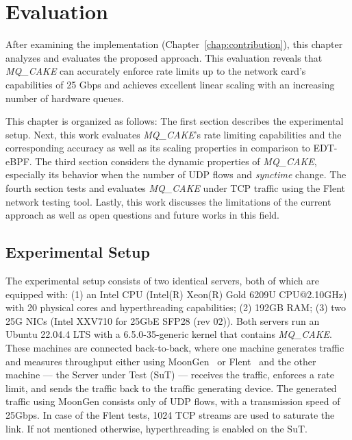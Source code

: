 \section{Evaluation}\label{sec:evaluation}
After examining the implementation (Chapter~\ref{chap:contribution}), this chapter analyzes and evaluates the proposed approach.
%
This evaluation reveals that \textit{MQ\_CAKE} can accurately enforce rate limits up to the network card's capabilities of 25 Gbps and achieves excellent linear scaling with an increasing number of hardware queues.

This chapter is organized as follows:
%
The first section describes the experimental setup. 
%
Next, this work evaluates \textit{MQ\_CAKE}'s rate limiting capabilities and the corresponding accuracy as well as its scaling properties in comparison to EDT-eBPF.
%
The third section considers the dynamic properties of \textit{MQ\_CAKE}, especially its behavior when the number of UDP flows and \textit{synctime} change.
%
The fourth section tests and evaluates \textit{MQ\_CAKE} under TCP traffic using the Flent~\cite{flent} network testing tool.
%
Lastly, this work discusses the limitations of the current approach as well as open questions and future works in this field.

\subsection{Experimental Setup}
The experimental setup consists of two identical servers, both of which are equipped with: 
(1) an Intel CPU (Intel(R) Xeon(R) Gold 6209U CPU@2.10GHz) with 20 physical cores and hyperthreading capabilities;
(2) 192GB RAM;
(3) two 25G NICs (Intel XXV710 for 25GbE SFP28 (rev 02)).
Both servers run an Ubuntu 22.04.4 LTS with a 6.5.0-35-generic kernel that contains \textit{MQ\_CAKE}. 
These machines are connected back-to-back, where one machine generates traffic and measures throughput either using MoonGen~\cite{moongen} or Flent~\cite{flent} and the other machine --- the Server under Test (SuT) --- receives the traffic, enforces a rate limit, and sends the traffic back to the traffic generating device.
%
The generated traffic using MoonGen consists only of UDP flows, with a transmission speed of 25Gbps.
%
In case of the Flent tests, 1024 TCP streams are used to saturate the link.
%
If not mentioned otherwise, hyperthreading is enabled on the SuT.

